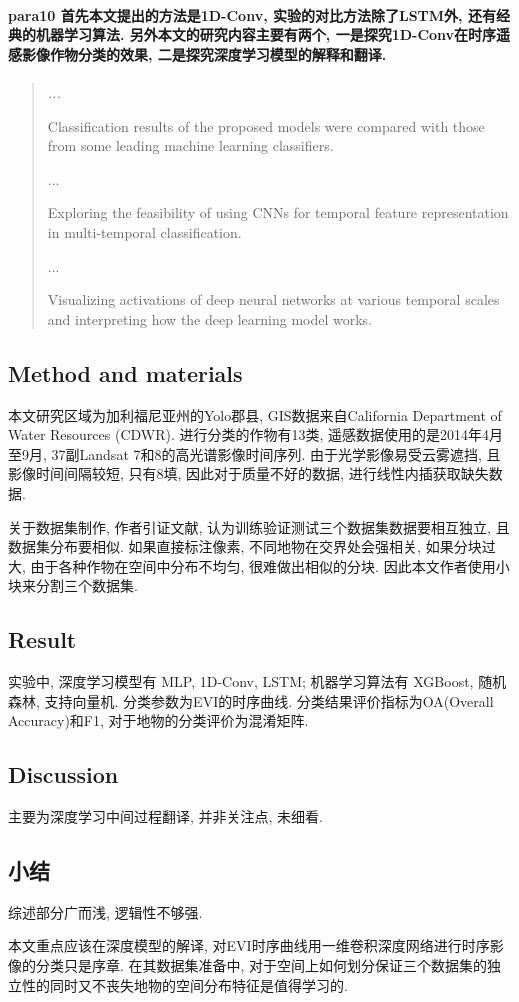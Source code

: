 \paragraph*{para10
    \textcolor[RGB]{17, 205, 29}{首先本文提出的方法是1D-Conv, 实验的对比方法除了LSTM外, 还有经典的机器学习算法. 另外本文的研究内容主要有两个, 一是探究1D-Conv在时序遥感影像作物分类的效果, 二是探究深度学习模型的解释和翻译.}}
\begin{quotation}
    \itshape
    ...

    Classification results of the proposed models were compared with those from some leading machine learning classifiers. 

    ...

    Exploring the feasibility of using CNNs for temporal feature representation in multi-temporal classification. 

    ...

    Visualizing activations of deep neural networks at various temporal scales and interpreting how the deep learning model works.
    
\end{quotation}

\subsection{Method and materials}
本文研究区域为加利福尼亚州的Yolo郡县, GIS数据来自California Department of Water Resources (CDWR). 进行分类的作物有13类, 遥感数据使用的是2014年4月至9月, 37副Landsat 7和8的高光谱影像时间序列. 由于光学影像易受云雾遮挡, 且影像时间间隔较短, 只有8填, 因此对于质量不好的数据, 进行线性内插获取缺失数据. 

关于数据集制作, 作者引证文献, 认为训练验证测试三个数据集数据要相互独立, 且数据集分布要相似. 如果直接标注像素, 不同地物在交界处会强相关, 如果分块过大, 由于各种作物在空间中分布不均匀, 很难做出相似的分块. 因此本文作者使用小块来分割三个数据集.

\subsection{Result}
实验中, 深度学习模型有 MLP, 1D-Conv, LSTM; 机器学习算法有   XGBoost, 随机森林, 支持向量机. 分类参数为EVI的时序曲线. 分类结果评价指标为OA(Overall Accuracy)和F1, 对于地物的分类评价为混淆矩阵. 

\subsection{Discussion}
主要为深度学习中间过程翻译, 并非关注点, 未细看. 

\subsection{小结}
综述部分广而浅, 逻辑性不够强. 

本文重点应该在深度模型的解译, 对EVI时序曲线用一维卷积深度网络进行时序影像的分类只是序章. 在其数据集准备中, 对于空间上如何划分保证三个数据集的独立性的同时又不丧失地物的空间分布特征是值得学习的.









